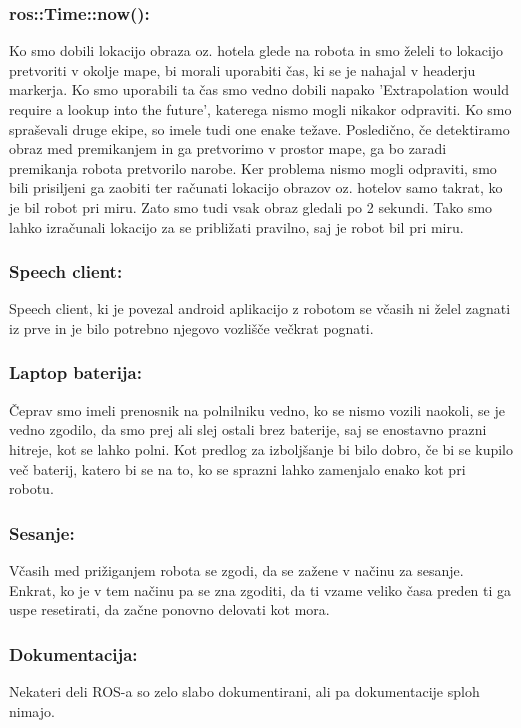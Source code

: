 \documentclass{llncs}
\begin{document}
\subsubsection{ros::Time::now():} Ko smo dobili lokacijo obraza oz. hotela glede na robota in smo želeli to lokacijo pretvoriti v okolje mape, bi morali uporabiti čas, ki se je nahajal v headerju markerja. Ko smo uporabili ta čas smo vedno dobili napako 'Extrapolation would require a lookup into the future', katerega nismo mogli nikakor odpraviti. Ko smo spraševali druge ekipe, so imele tudi one enake težave. Posledično, če detektiramo obraz med premikanjem in ga pretvorimo v prostor mape, ga bo zaradi premikanja robota pretvorilo narobe. Ker problema nismo mogli odpraviti, smo bili prisiljeni ga zaobiti ter računati lokacijo obrazov oz. hotelov samo takrat, ko je bil robot pri miru. Zato smo tudi vsak obraz gledali po 2 sekundi. Tako smo lahko izračunali lokacijo za se približati pravilno, saj je robot bil pri miru.
\subsubsection{Speech client:} Speech client, ki je povezal android aplikacijo z robotom se včasih ni želel zagnati iz prve in je bilo potrebno njegovo vozlišče večkrat pognati.
\subsubsection{Laptop baterija:} Čeprav smo imeli prenosnik na polnilniku vedno, ko se nismo vozili naokoli, se je vedno zgodilo, da smo prej ali slej ostali brez baterije, saj se enostavno prazni hitreje, kot se lahko polni. Kot predlog za izboljšanje bi bilo dobro, če bi se kupilo več baterij, katero bi se na to, ko se sprazni lahko zamenjalo enako kot pri robotu.
\subsubsection{Sesanje:} Včasih med prižiganjem robota se zgodi, da se zažene v načinu za sesanje. Enkrat, ko je v tem načinu pa se zna zgoditi, da ti vzame veliko časa preden ti ga uspe resetirati, da začne ponovno delovati kot mora.
\subsubsection{Dokumentacija:} Nekateri deli ROS-a so zelo slabo dokumentirani, ali pa dokumentacije sploh nimajo.
\end{document}
